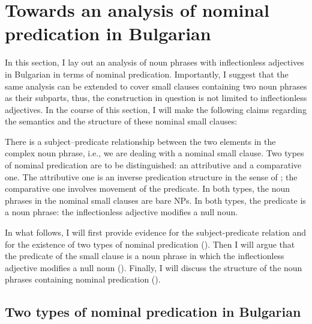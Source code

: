 \documentclass[output=paper]{langscibook}
\begin{document}
\section{Towards an analysis of nominal predication in Bulgarian} \label{ge-sec-analysis}

In this section, I lay out an analysis of noun phrases with inflectionless adjectives in Bulgarian in terms of nominal predication. %
Importantly, I suggest that the same analysis can be extended to cover small clauses containing two noun phrases as their subparts, thus, the construction in question is not limited to inflectionless adjectives. In the course of this section, I will make the following claims regarding the semantics and the structure of these nominal small clauses: 

\eanoraggedright \label{ge-claims}
\eanoraggedright There is a subject--predicate relationship between the two elements in the complex noun phrase, i.e., we are dealing with a nominal small clause. \label{ge-claim-sc}
\ex Two types of nominal predication are to be distinguished: an attributive and a comparative one. \label{ge-claim-attrcmpr}
\ex The attributive one is an inverse predication structure in the sense of \citet{denDikken2006}; the comparative one involves movement of the predicate. \label{ge-claim-struct}
\ex In both types, the noun phrases in the nominal small clauses are bare NPs. \label{ge-claim-size}
\ex In both types, the predicate is a noun phrase: the inflectionless adjective modifies a null noun. \label{ge-claim-nulln}
\z
\z

\noindent In what follows, I will first provide evidence for the subject-predicate relation and for the existence of two types of nominal predication (). Then I will argue that the predicate of the small clause is a noun phrase in which the inflectionless adjective modifies a null noun (). Finally, I will discuss the structure of the noun phrases containing nominal predication (). 


\subsection{Two types of nominal predication in Bulgarian} \label{ge-sec:3.2.1}
\end{document}
